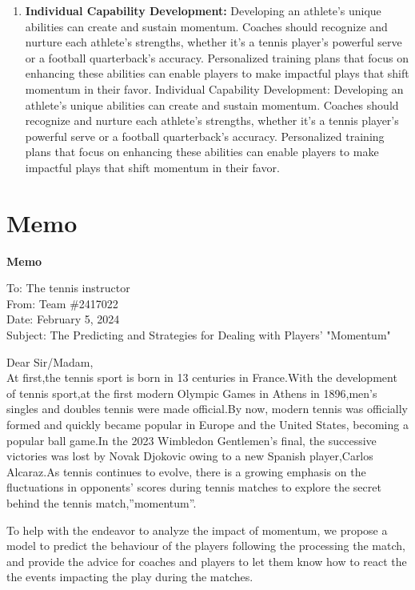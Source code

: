 \documentclass{article}
\begin{document}
\begin{enumerate}
      \item \textbf{Individual Capability Development: } Developing an athlete's unique abilities can create and sustain momentum. Coaches should recognize and nurture each athlete's strengths, whether it's a tennis player's powerful serve or a football quarterback's accuracy. Personalized training plans that focus on enhancing these abilities can enable players to make impactful plays that shift momentum in their favor.
      Individual Capability Development: Developing an athlete's unique abilities can create and sustain momentum. Coaches should recognize and nurture each athlete's strengths, whether it's a tennis player's powerful serve or a football quarterback's accuracy. Personalized training plans that focus on enhancing these abilities can enable players to make impactful plays that shift momentum in their favor.
\end{enumerate}
\section{Memo}
\begin{center}
      \textbf{Memo}
\end{center}

To: The tennis instructor\\
From: Team \#2417022\\
Date: February 5, 2024\\
Subject: The Predicting and Strategies for Dealing with Players' "Momentum"

Dear Sir/Madam,\\

At first,the tennis sport is born in 13 centuries in France.With the development of tennis sport,at the first modern Olympic Games in Athens in 1896,men's singles and doubles tennis were made official.By now, modern tennis was officially formed and quickly became popular in Europe and the United States, becoming a popular ball game.In the 2023 Wimbledon Gentlemen's final, the successive victories was lost by Novak Djokovic owing to a new Spanish player,Carlos Alcaraz.As tennis continues to evolve, there is a growing emphasis on the fluctuations in opponents' scores during tennis matches to explore the secret behind the tennis match,”momentum”.

To help with the endeavor to analyze the impact of momentum, we propose a model to predict the behaviour of the players following the processing the match, and provide the advice for coaches and players to let them know how to react the the events impacting the play during the matches.
\end{document}
